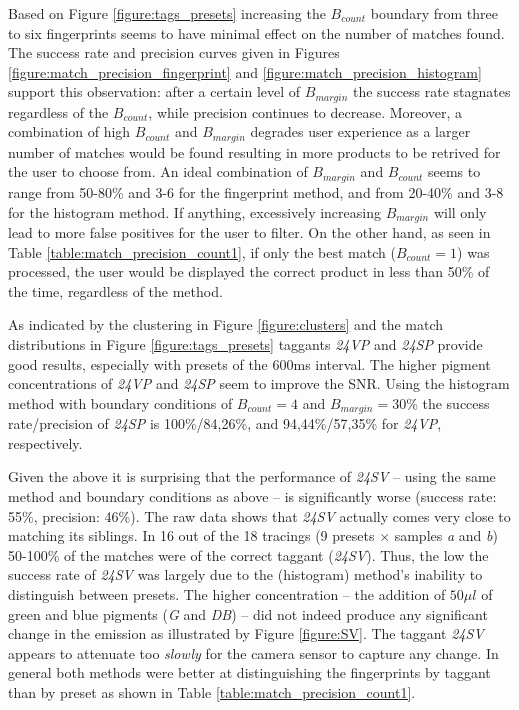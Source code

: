 \documentclass[thesis.tex]{subfiles}
\begin{document}
Based on Figure \ref{figure:tags_presets} increasing the $B_{count}$ boundary from three to six fingerprints seems to have minimal effect on the number of matches found. The success rate and precision curves given in Figures \ref{figure:match_precision_fingerprint} and \ref{figure:match_precision_histogram} support this observation: after a certain level of $B_{margin}$ the success rate stagnates regardless of the $B_{count}$, while precision continues to decrease. Moreover, a combination of high $B_{count}$ and $B_{margin}$ degrades user experience as a larger number of matches would be found resulting in more products to be retrived for the user to choose from. An ideal combination of $B_{margin}$ and $B_{count}$ seems to range from 50-80\% and 3-6 for the fingerprint method, and from 20-40\% and 3-8 for the histogram method. If anything, excessively increasing $B_{margin}$ will only lead to more false positives for the user to filter. On the other hand, as seen in Table \ref{table:match_precision_count1}, if only the best match ($B_{count} = 1$) was processed, the user would be displayed the correct product in less than 50\% of the time, regardless of the method.

As indicated by the clustering in Figure \ref{figure:clusters} and the match distributions in Figure \ref{figure:tags_presets} taggants \emph{24VP} and \emph{24SP} provide good results, especially with presets of the 600ms interval. The higher pigment concentrations of \emph{24VP} and \emph{24SP} seem to improve the SNR. Using the histogram method with boundary conditions of $B_{count} = 4$ and $B_{margin} = 30\%$ the success rate/precision of \emph{24SP} is 100\%/84,26\%, and 94,44\%/57,35\% for \emph{24VP}, respectively.

Given the above it is surprising that the performance of \emph{24SV} -- using the same method and boundary conditions as above -- is significantly worse (success rate: 55\%, precision: 46\%). The raw data shows that \emph{24SV} actually comes very close to matching its siblings. In 16 out of the 18 tracings (9 presets $\times$ samples \emph{a} and \emph{b}) 50-100\% of the matches were of the correct taggant (\emph{24SV}). Thus, the low the success rate of \emph{24SV} was largely due to the (histogram) method's inability to distinguish between presets. The higher concentration -- the addition of $50\mu l$ of green and blue pigments (\emph{G} and \emph{DB}) -- did not indeed produce any significant change in the emission as illustrated by Figure \ref{figure:SV}. The taggant \emph{24SV} appears to attenuate too \emph{slowly} for the camera sensor to capture any change. In general both methods were better at distinguishing the fingerprints by taggant than by preset as shown in Table \ref{table:match_precision_count1}.
\end{document}
